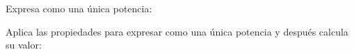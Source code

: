 \documentclass[addpoints,spanish, 12pt,a4paper]{exam}
\renewcommand*\half{.5}
\begin{document}
\begin{questions}




\question[1\half] Expresa como una única potencia:
\begin{multicols}{3}
\end{multicols}



\question[2] Aplica las propiedades para expresar como una única potencia y después calcula su valor:
\begin{multicols}{2}
\end{multicols}
\end{questions}
\end{document}
